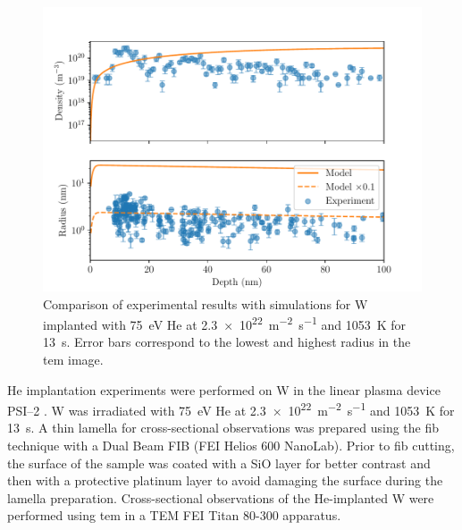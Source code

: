 \begin{figure} [h!]
    \centering
    \includegraphics[width=\linewidth]{Figures/Chapter4/comparison_model_exp.pdf}
    \caption{Comparison of experimental results with simulations for W implanted with \SI{75}{eV} He at \SI{2.3e22}{m^{-2}.s^{-1}} and \SI{1053}{K} for \SI{13}{s}. Error bars correspond to the lowest and highest radius in the \gls{tem} image.}
\end{figure}


He implantation experiments were performed on W in the linear plasma device PSI--2 .
W was irradiated with \SI{75}{eV} He at \SI{2.3e22}{m^{-2}.s^{-1}} and \SI{1053}{K} for \SI{13}{s}.
A thin lamella for cross-sectional observations was prepared using the \gls{fib} technique with a Dual Beam FIB (FEI Helios 600 NanoLab).
Prior to \gls{fib} cutting, the surface of the sample was coated with a SiO layer for better contrast and then with a protective platinum layer to avoid damaging the surface during the lamella preparation.
Cross-sectional observations of the He-implanted W were performed using \gls{tem} in a TEM FEI Titan 80-300 apparatus.

